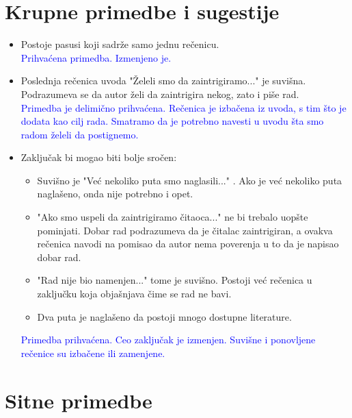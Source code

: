\documentclass[a4paper]{report}
\newcommand{\odgovor}[1]{\textcolor{blue}{#1}}
\begin{document}
\section{Krupne primedbe i sugestije}

\begin{itemize}
    \item Postoje pasusi koji sadrže samo jednu rečenicu.
    \\ \odgovor{Prihvaćena primedba. Izmenjeno je.} 
    \item Poslednja rečenica uvoda "Želeli smo da zaintrigiramo..." je suvišna. Podrazumeva se da autor želi da zaintrigira nekog, zato i piše rad.
    \\ \odgovor{Primedba je delimično prihvaćena. Rečenica je izbačena iz uvoda, s tim što je dodata kao cilj rada. Smatramo da je potrebno navesti u uvodu šta smo radom želeli da postignemo.}
    \item Zaključak bi mogao biti bolje sročen:
    \begin{itemize}
    \item Suvišno je "Već nekoliko puta smo naglasili..." . Ako je već nekoliko puta naglašeno, onda nije potrebno i opet.
    \item "Ako smo uspeli da zaintrigiramo čitaoca..." ne bi trebalo uopšte pominjati. Dobar rad podrazumeva da je čitalac zaintrigiran, a ovakva rečenica navodi na pomisao da autor nema poverenja u to da je napisao dobar rad.
    \item "Rad nije bio namenjen..." tome je suvišno. Postoji već rečenica u zaključku koja objašnjava čime se rad ne bavi.
    \item Dva puta je naglašeno da postoji mnogo dostupne literature.
    \end{itemize}
    \odgovor {Primedba prihvaćena. Ceo zaključak je izmenjen. Suvišne i ponovljene rečenice su izbačene ili zamenjene.}
\end{itemize}


\section{Sitne primedbe}
\end{document}
